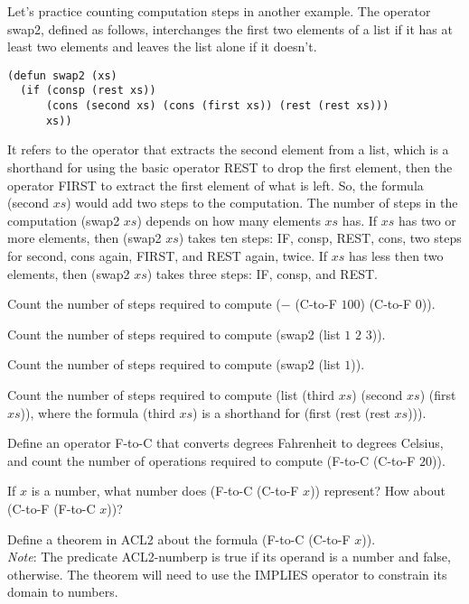 Let's practice counting computation steps in another example.
The operator swap2, defined as follows, interchanges the
first two elements of a list if it has at least two elements
and leaves the list alone if it doesn't.

\begin{Verbatim}
(defun swap2 (xs)
  (if (consp (rest xs))
      (cons (second xs) (cons (first xs)) (rest (rest xs)))
      xs))
\end{Verbatim}

It refers to the operator that extracts the second element from a list,
which is a shorthand for using the basic operator REST to drop the
first element, then the operator FIRST to extract the first element
of what is left.
\label{steps-in-second-op}
So, the formula (second $xs$) would add two steps
to the computation. The number of steps in the computation (swap2 $xs$)
depends on how many elements $xs$ has. If $xs$ has two or more elements,
then (swap2 $xs$) takes ten steps: IF, consp, REST, cons, two steps for second,
cons again, FIRST, and REST again, twice.
If $xs$ has less then two elements, then (swap2 $xs$) takes three steps:
IF, consp, and REST.

\begin{ExerciseList}

\Exercise
Count the number of steps required to compute ($-$ (C-to-F $100$) (C-to-F $0$)).

\Exercise
Count the number of steps required to compute (swap2 (list $1$ $2$ $3$)).

\Exercise
Count the number of steps required to compute (swap2 (list $1$)).

\Exercise
Count the number of steps required to compute
(list (third $xs$) (second $xs$) (first $xs$)),
where the formula (third $xs$) is a shorthand for
(first (rest (rest $xs$))).

\Exercise
Define an operator F-to-C that converts degrees Fahrenheit
to degrees Celsius, and count the number of operations
required to compute (F-to-C (C-to-F $20$)).

\Exercise
If $x$ is a number, what number does (F-to-C (C-to-F $x$))
represent? How about (C-to-F (F-to-C $x$))?

\Exercise
Define a theorem in ACL2 about the formula (F-to-C (C-to-F $x$)). \\
\emph{Note}: The predicate ACL2-numberp is true if its operand is a number
and false, otherwise.
The theorem will need to use the IMPLIES operator to constrain its domain
to numbers.

\end{ExerciseList}

